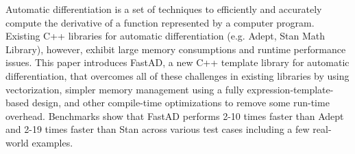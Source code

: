 Automatic differentiation is a set of techniques to efficiently and accurately
compute the derivative of a function represented by a computer program.
Existing C++ libraries for automatic differentiation (e.g. Adept, Stan Math Library),
however, exhibit large memory consumptions and runtime performance issues.
This paper introduces FastAD, a new C++ template library for automatic differentiation,
that overcomes all of these challenges in existing libraries by using vectorization,
simpler memory management using a fully expression-template-based design,
and other compile-time optimizations to remove some run-time overhead.
Benchmarks show that FastAD performs 2-10 times faster than Adept
and 2-19 times faster than Stan
across various test cases including a few real-world examples.

